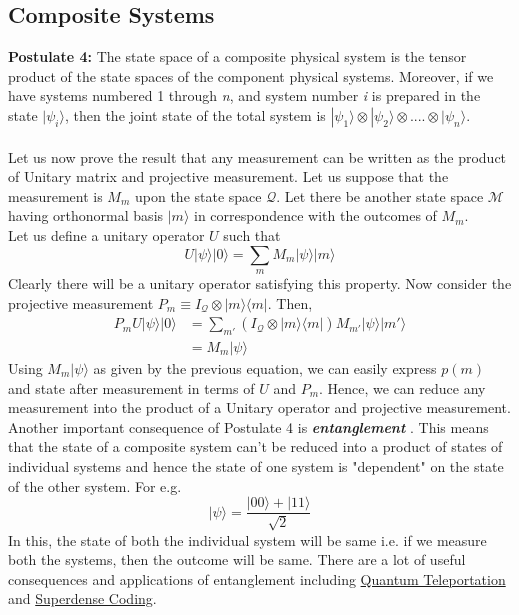 \subsection{Composite Systems}
{\bf Postulate 4: }The state space of a composite physical system is the tensor product
of the state spaces of the component physical systems. Moreover, if we have
systems numbered 1 through {\it n}, and system number {\it i} is prepared in the state $|\psi_i\rangle$, then the joint state of the total system is $|\psi_1\rangle \otimes |\psi_2\rangle \otimes ....\otimes |\psi_n\rangle $.\\\\
Let us now prove the result that any measurement can be written as the product of Unitary matrix and projective measurement. Let us suppose that the measurement is $M_m$ upon the state space $\mathcal{Q}$. Let there be another state space $\mathcal{M}$ having orthonormal basis $|m\rangle$ in correspondence with the outcomes of $M_m$. \\
Let us define a unitary operator $U$ such that \\
\begin{equation}
U|\psi\rangle |0\rangle = \sum_m M_m |\psi\rangle |m\rangle
\end{equation}Clearly there will be a unitary operator satisfying this property. Now consider the projective measurement $P_m \equiv I_\mathcal{Q} \otimes |m\rangle \langle m|$. Then,
\begin{equation}
\begin{split}
 P_m U |\psi\rangle |0\rangle &  = \sum_{m'} (I_\mathcal{Q} \otimes |m\rangle \langle m | ) M_ {m'} | \psi\rangle | m' \rangle \\
& = M_m | \psi \rangle
\end{split}
\end{equation}
Using $M_m|\psi\rangle$ as given by the previous equation, we can easily express $p(m)$ and state after measurement in terms of $U$ and $P_m$. Hence, we can reduce any measurement into the product of a Unitary operator and projective measurement. \\
Another important consequence of Postulate 4 is {\bf \it entanglement} . This means that the state of a composite system can't be reduced into a product of states of individual systems and hence the state of one system is "dependent" on the state of the other system. For e.g. 
\[ | \psi \rangle = \frac{|00 \rangle + | 11 \rangle}{\sqrt{2}}\]
In this, the state of both the individual system will be same i.e. if we measure both the systems, then the outcome will be same. There are a lot of useful consequences and applications of entanglement including \href{https://en.wikipedia.org/wiki/Quantum_teleportation}{Quantum Teleportation} and \href{https://qiskit.org/n bit toffoli gate using cnot gatestextbook/ch-algorithms/superdense-coding.html}{Superdense Coding}.
\newpage
